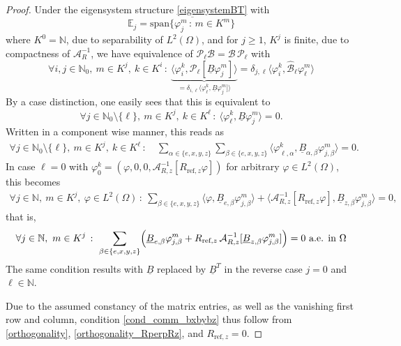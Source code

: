 \documentclass[12pt]{article}
\newcommand\calA{\mathcal{A}}
\newcommand\BB{\mathcal{B}}
\newcommand\Proj{\mathcal{P}}
\newcommand\ulB{\underline{B}}
\begin{document}
\begin{proof}
Under the eigensystem structure \eqref{eigensystemBT} with
\[
\mathbb{E}_j=\overline{\text{span}\{\varphi_j^m\,:\,m\in K^m\} }
\]
where $K^0=\mathbb{N}$, due to separability of $L^2(\Omega)$, and for $j\geq1$, $K^j$ is finite, due to compactness of $\calA_R^{-1}$, 
we have equivalence of $\Proj_\ell\BB=\BB\,\Proj_\ell$ with 
\[
\forall i,j\in \mathbb{N}_0, \ m\in K^j, \ k\in K^i \,:\
\underbrace{\langle \varphi_i^k,\Proj_\ell [\ulB \varphi_j^m] \rangle}_{
=\delta_{i,\ell} \langle \varphi_\ell^k,\ulB \varphi_j^m] \rangle}
= \delta_{j,\ell} \langle \varphi_i^k,\hat{\BB}_\ell \varphi_\ell^m \rangle 
\]
By a case distinction, one easily sees that 
this is equivalent to
\begin{equation}\label{commBB_orth}
\forall j\in \mathbb{N}_0\setminus\{\ell\}, \ m\in K^j, \ k\in K^\ell \,:\
\langle \varphi_\ell^k,\ulB \varphi_j^m \rangle=0.
\end{equation}
Written in a component wise manner, this reads as 
\begin{equation}\label{cond_comm_bxbybz}
\begin{aligned}
\forall j\in \mathbb{N}_0\setminus\{\ell\}, \ m\in K^j, \ k\in K^\ell \,:\
& 
\sum_{\alpha\in\{e,x,y,z\}} \sum_{\beta\in\{e,x,y,z\}}
\langle \varphi_{\ell,\alpha}^k,\ulB_{\alpha,\beta} \varphi_{j,\beta}^m \rangle
=0.
\end{aligned}
\end{equation}
In case $\ell=0$ with $\varphi_0^k=(\varphi,0,0, \calA_{R,z}^{-1}[R_{\text{ref},z}\varphi])$ for arbitrary $\varphi\in L^2(\Omega)$, this becomes
\[
\begin{aligned}
\forall j\in \mathbb{N}, \ m\in K^j, \ \varphi\in L^2(\Omega) \,:\
\sum_{\beta\in\{e,x,y,z\}}
\langle \varphi,\ulB_{e,\beta} \varphi_{j,\beta}^m \rangle
+\langle \calA_{R,z}^{-1}[R_{\text{ref},z}\varphi],\ulB_{z,\beta} \varphi_{j,\beta}^m \rangle
=0,
\end{aligned}
\]
that is,
\begin{equation}\label{commcond_ell0}
\begin{aligned}
\forall j\in \mathbb{N}, \ m\in K^j \,:\
\sum_{\beta\in\{e,x,y,z\}}\Bigl(\ulB_{e,\beta} \varphi_{j,\beta}^m
+R_{\text{ref},z}\, \calA_{R,z}^{-1}[\ulB_{z,\beta} \varphi_{j,\beta}^m]\Bigr)
=0 \text{ a.e. in }\Omega
\end{aligned}
\end{equation}
The same condition results with $\ulB$ replaced by $\ulB^T$ in the reverse case $j=0$ and $\ell\in\mathbb{N}$.

Due to the assumed constancy of the matrix entries, as well as the vanishing first row and column, condition \eqref{cond_comm_bxbybz} thus follow from \eqref{orthogonality}, \eqref{orthogonality_RperpRz}, and $R_{\text{ref},z}=0$.
\end{proof}
\end{document}
